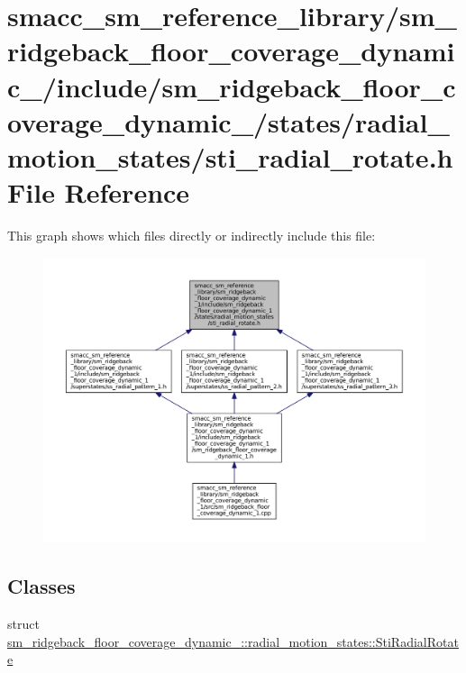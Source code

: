 \hypertarget{sm__ridgeback__floor__coverage__dynamic__1_2include_2sm__ridgeback__floor__coverage__dynamic__1_bd33d5b95acb5398b84394e1567eb779}{}\section{smacc\+\_\+sm\+\_\+reference\+\_\+library/sm\+\_\+ridgeback\+\_\+floor\+\_\+coverage\+\_\+dynamic\+\_/include/sm\+\_\+ridgeback\+\_\+floor\+\_\+coverage\+\_\+dynamic\+\_/states/radial\+\_\+motion\+\_\+states/sti\+\_\+radial\+\_\+rotate.h File Reference}
\label{sm__ridgeback__floor__coverage__dynamic__1_2include_2sm__ridgeback__floor__coverage__dynamic__1_bd33d5b95acb5398b84394e1567eb779}
This graph shows which files directly or indirectly include this file\+:
\nopagebreak
\begin{figure}[H]
\begin{center}
\leavevmode
\includegraphics[width=350pt]{sm__ridgeback__floor__coverage__dynamic__1_2include_2sm__ridgeback__floor__coverage__dynamic__1_4d60db0f61ac93c1a1b0b23dff06ce67}
\end{center}
\end{figure}
\subsection*{Classes}
\begin{DoxyCompactItemize}
\item 
struct \hyperlink{structsm__ridgeback__floor__coverage__dynamic__1_1_1radial__motion__states_1_1StiRadialRotate}{sm\+\_\+ridgeback\+\_\+floor\+\_\+coverage\+\_\+dynamic\+\_\+::radial\+\_\+motion\+\_\+states\+::\+Sti\+Radial\+Rotate}
\end{DoxyCompactItemize}
